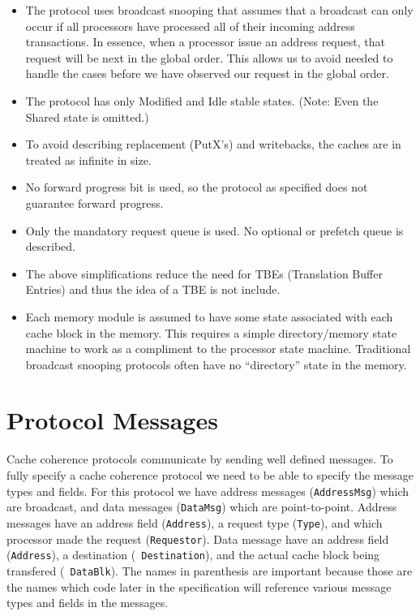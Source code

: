 \documentclass[11pt]{article}
\begin{document}
\begin{itemize}

\item 
The protocol uses broadcast snooping that assumes that a broadcast can
only occur if all processors have processed all of their incoming
address transactions.  In essence, when a processor issue an address
request, that request will be next in the global order.  This allows
us to avoid needed to handle the cases before we have observed our
request in the global order.

\item 
The protocol has only Modified and Idle stable states.  (Note: Even
the Shared state is omitted.)

\item 
To avoid describing replacement (PutX's) and writebacks, the caches
are in treated as infinite in size.

\item
No forward progress bit is used, so the protocol as specified does not
guarantee forward progress.

\item
Only the mandatory request queue is used.  No optional or prefetch
queue is described.

\item
The above simplifications reduce the need for TBEs (Translation Buffer
Entries) and thus the idea of a TBE is not include.

\item
Each memory module is assumed to have some state associated with each
cache block in the memory.  This requires a simple directory/memory
state machine to work as a compliment to the processor state machine.
Traditional broadcast snooping protocols often have no ``directory''
state in the memory.

\end{itemize}

\section*{Protocol Messages}

Cache coherence protocols communicate by sending well defined
messages.  To fully specify a cache coherence protocol we need to be
able to specify the message types and fields.  For this protocol we
have address messages ({\tt AddressMsg}) which are broadcast, and data
messages ({\tt DataMsg}) which are point-to-point.  Address messages
have an address field ({\tt Address}), a request type ({\tt Type}),
and which processor made the request ({\tt Requestor}).  Data message
have an address field ({\tt Address}), a destination ({\tt
Destination}), and the actual cache block being transfered ({\tt
DataBlk}).  The names in parenthesis are important because those are
the names which code later in the specification will reference various
message types and fields in the messages.
\end{document}
